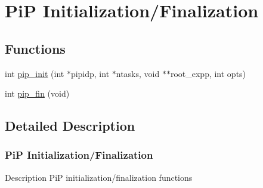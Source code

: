 \hypertarget{group__PiP-0-init-fin}{\section{Pi\-P Initialization/\-Finalization}
\label{group__PiP-0-init-fin}
}
\subsection*{Functions}
\begin{DoxyCompactItemize}
\item 
int \hyperlink{group__PiP-0-init-fin_gad4e0db6c69792b3fa014e3310892a0eb}{pip\-\_\-init} (int $\ast$pipidp, int $\ast$ntasks, void $\ast$$\ast$root\-\_\-expp, int opts)
\item 
int \hyperlink{group__PiP-0-init-fin_gac4654282785abb9434ce81573fdf16ed}{pip\-\_\-fin} (void)
\end{DoxyCompactItemize}


\subsection{Detailed Description}
\hypertarget{pip-intialize-finalize}{}\subsubsection{Pi\-P Initialization/\-Finalization}\label{pip-intialize-finalize}
\begin{DoxyParagraph}{Description}
Pi\-P initialization/finalization functions 
\end{DoxyParagraph}


